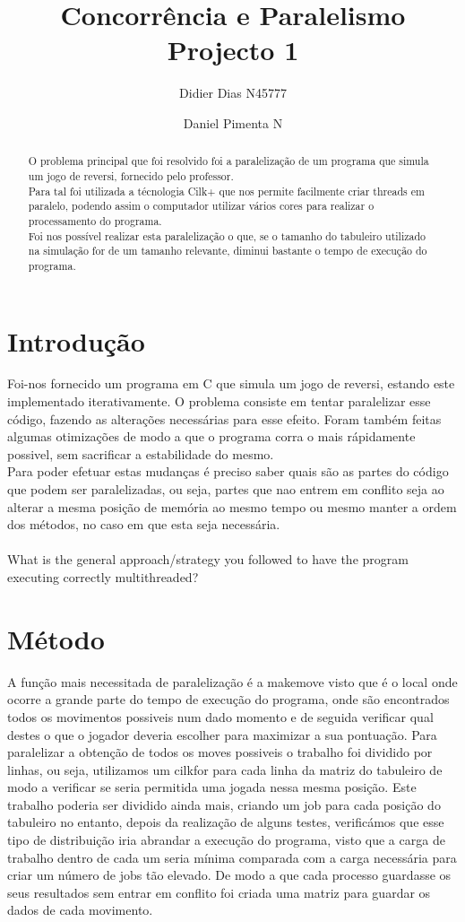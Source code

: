 \documentclass[a4paper]{article}
\title{Concorrência e Paralelismo \\
\large Projecto 1}
\author{Didier Dias N45777\and Daniel Pimenta N}
\begin{document}
\maketitle

\begin{abstract}
O problema principal que foi resolvido foi a paralelização de um programa que simula um jogo de reversi, fornecido pelo professor. \\
Para tal foi utilizada a técnologia Cilk+ que nos permite facilmente criar threads em paralelo, podendo assim o computador utilizar vários cores para realizar o processamento do programa.\\
Foi nos possível realizar esta paralelização o que, se o  tamanho do tabuleiro utilizado na simulação for de um tamanho relevante, diminui bastante o tempo de execução do programa.
\end{abstract}

\section{Introdução}

Foi-nos fornecido um programa em C que simula um jogo de reversi, estando este implementado iterativamente. O problema consiste em tentar paralelizar esse código, fazendo as alterações necessárias para esse efeito. Foram também feitas algumas otimizações de modo a que o programa corra o mais rápidamente possivel, sem sacrificar a estabilidade do mesmo.\\
Para poder efetuar estas mudanças é preciso saber quais são as partes do código que podem ser paralelizadas, ou seja, partes que nao entrem em conflito seja ao alterar a mesma posição de memória ao mesmo tempo ou mesmo manter a ordem dos métodos, no caso em que esta seja necessária.\\\\
What	is	the	general	
approach/strategy	you	 followed	 to	have	 the	program	executing	correctly	multithreaded?

\section{Método}
A função mais necessitada de paralelização é a make\textunderscore move visto que é o local onde ocorre a grande parte do tempo de execução do programa, onde são encontrados todos os movimentos possiveis num dado momento e de seguida verificar qual destes o que o jogador deveria escolher para maximizar a sua pontuação. Para paralelizar a obtenção de todos os moves possiveis o trabalho foi dividido por linhas, ou seja, utilizamos um cilk\textunderscore for para cada linha da matriz do tabuleiro de modo a verificar se seria permitida uma jogada nessa mesma posição. Este trabalho poderia ser dividido ainda mais, criando um job para cada posição do tabuleiro no entanto, depois da realização de alguns testes, verificámos que esse tipo de distribuição iria abrandar a execução do programa, visto que a carga de trabalho dentro de cada um seria mínima comparada com a carga necessária para criar um número de jobs tão elevado.
De modo a que cada processo guardasse os seus resultados sem entrar em conflito foi criada uma matriz para guardar os dados de cada movimento.
\end{document}
